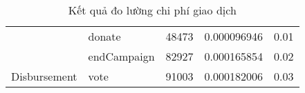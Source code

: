 \documentclass[../main-report.tex]{subfiles}
\begin{document}
\begin{table}[!ht]
\begin{tabular}{|l|l|l|l|l|}
                                        & donate                            & 48473                                                                                             & 0.000096946                                                                                       & 0.01                                                                                              \\ \cline{2-5} 
                                        & endCampaign                       & 82927                                                                                             & 0.000165854                                                                                       & 0.02                                                                                              \\ \hline
Disbursement                            & vote                              & 91003                                                                                             & 0.000182006                                                                                       & 0.03                                                                                              \\ \hline
\end{tabular}
\caption{Kết quả đo lường chi phí giao dịch}
\label{tab:result-cost-perform}
\end{table}
\end{document}
